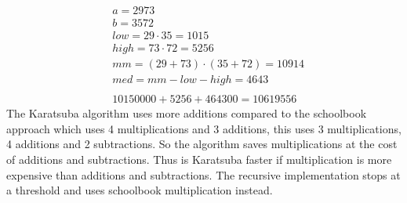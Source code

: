 \begin{equation*}
    \begin{split}
        & a = 2973\\
        & b = 3572\\
        & low = 29 \cdot 35 = 1015\\
        & high = 73 \cdot 72 = 5256\\
        & mm = (29 + 73) \cdot (35 + 72) = 10914\\
        & med = mm - low - high = 4643\\
        \\
        & 10150000 + 5256 + 464300 = 10619556
    \end{split}
\end{equation*}
The Karatsuba algorithm uses more additions compared to the schoolbook approach which uses 4 multiplications and 3 additions, this uses 3 multiplications, 4 additions and 2 subtractions. So the algorithm saves multiplications at the cost of additions and subtractions. Thus is Karatsuba faster if multiplication is more expensive than additions and subtractions. The recursive implementation stops at a threshold and uses schoolbook multiplication instead.\\
\medskip

